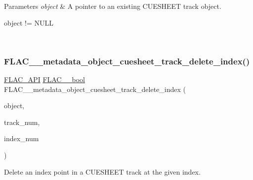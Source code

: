 \begin{DoxyParams}{Parameters}
{\em object} & A pointer to an existing C\+U\+E\+S\+H\+E\+ET track object.  
\begin{DoxyCode}
\textcolor{keywordtype}{object} != NULL 
\end{DoxyCode}
 \\
\hline
\end{DoxyParams}
\mbox{\label{group__flac__metadata__object_ga9cba3429dcc863714ceb1de6952c4737}} 
\subsubsection{\texorpdfstring{F\+L\+A\+C\+\_\+\+\_\+metadata\+\_\+object\+\_\+cuesheet\+\_\+track\+\_\+delete\+\_\+index()}{FLAC\_\_metadata\_object\_cuesheet\_track\_delete\_index()}}
{\footnotesize\ttfamily \hyperlink{group__flac__export_ga56ca07df8a23310707732b1c0007d6f5}{F\+L\+A\+C\+\_\+\+A\+PI} \hyperlink{ordinals_8h_a95103469f1cbd78b8cf250194985b34e}{F\+L\+A\+C\+\_\+\+\_\+bool} F\+L\+A\+C\+\_\+\+\_\+metadata\+\_\+object\+\_\+cuesheet\+\_\+track\+\_\+delete\+\_\+index (\begin{DoxyParamCaption}\item[{\hyperlink{struct_f_l_a_c_____stream_metadata}{F\+L\+A\+C\+\_\+\+\_\+\+Stream\+Metadata} $\ast$}]{object,  }\item[{unsigned}]{track\+\_\+num,  }\item[{unsigned}]{index\+\_\+num }\end{DoxyParamCaption})}

Delete an index point in a C\+U\+E\+S\+H\+E\+ET track at the given index.


